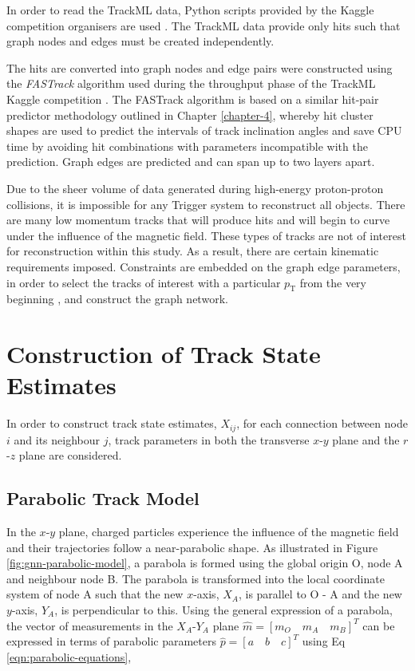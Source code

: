 In order to read the TrackML data, Python scripts provided by the Kaggle competition organisers are used \cite{python-scripts-kaggle}. The TrackML data provide only hits such that graph nodes and edges must be created independently.

The hits are converted into graph nodes and edge pairs were constructed using the \textit{FASTrack} algorithm used during the throughput phase of the TrackML Kaggle competition \cite{Amrouche2023}. The FASTrack algorithm is based on a similar hit-pair predictor methodology outlined in Chapter \ref{chapter-4}, whereby hit cluster shapes are used to predict the intervals of track inclination angles and save CPU time by avoiding hit combinations with parameters incompatible with the prediction. Graph edges are predicted and can span up to two layers apart.

Due to the sheer volume of data generated during high-energy proton-proton collisions, it is impossible for any Trigger system to reconstruct all objects. There are many low momentum tracks that will produce hits and will begin to curve under the influence of the magnetic field. These types of tracks are not of interest for reconstruction within this study. As a result, there are certain kinematic requirements imposed. Constraints are embedded on the graph edge parameters, in order to select the tracks of interest with a particular $p_{\text{T}}$ from the very beginning \cite{Dmitry-fasttrack-addtest}, and construct the graph network. 



\section{Construction of Track State Estimates}
\label{constructing-track-states}

In order to construct track state estimates, $X_{ij}$, for each connection between node $i$ and its neighbour $j$, track parameters in both the transverse $x$-$y$ plane and the $r$-$z$ plane are considered.


\subsection{Parabolic Track Model}
\label{parabolic-state}

In the $x$-$y$ plane, charged particles experience the influence of the magnetic field and their trajectories follow a near-parabolic shape. As illustrated in Figure \ref{fig:gnn-parabolic-model}, a parabola is formed using the global origin O, node A and neighbour node B. The parabola is transformed into the local coordinate system of node A such that the new $x$-axis, $X_A$, is parallel to O - A and the new $y$-axis, $Y_A$, is perpendicular to this. Using the general expression of a parabola, the vector of measurements in the $X_A$-$Y_A$ plane $ \hat{m} = [m_O \quad m_A \quad m_B]^{T}$ can be expressed in terms of parabolic parameters $\hat{p} = [a \quad b \quad c]^{T}$ using Eq \eqref{eqn:parabolic-equations}, 

